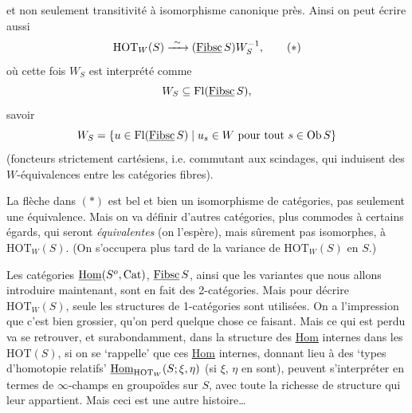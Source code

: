 et non seulement transitivité à isomorphisme canonique près. Ainsi on peut écrire aussi
\[
\mathrm{HOT}_W(S) \xrightarrow{\ \sim\ } (\underline{\mathrm{Fibsc}}\,S)W_S^{-1}, \tag*{$(*)$}
\]
où cette fois $W_S$ est interprété comme
\[
W_S \subseteq \mathrm{Fl}(\underline{\mathrm{Fibsc}}\,S),
\]
savoir
\[
W_S = \{u \in \mathrm{Fl}(\underline{\mathrm{Fibsc}}\,S) \mid u_s \in W \text{ pour tout } s \in \mathrm{Ob}\,S\}
\]
(foncteurs strictement cartésiens, i.e. commutant aux scindages, qui induisent des $W$-équivalences entre les catégories fibres).

La flèche dans $(*)$ est bel et bien un isomorphisme de catégories, pas seulement une équivalence. Mais on va définir d'autres catégories, plus commodes à certains égards, qui seront \textit{équivalentes} (on l'espère), mais sûrement pas isomorphes, à $\mathrm{HOT}_W(S)$. (On s'occupera plus tard de la variance de $\mathrm{HOT}_W(S)$ en $S$.)

Les catégories $\underline{\mathrm{Hom}}(S^o,\mathrm{Cat})$, $\underline{\mathrm{Fibsc}}\,S$, ainsi que les variantes que nous allons introduire maintenant, sont en fait des 2-catégories. Mais pour décrire $\mathrm{HOT}_W(S)$, seule les structures de 1-catégories sont utilisées. On a l'impression que c'est bien %
grossier, qu'on perd quelque chose ce faisant. Mais ce qui est perdu va se retrouver, et surabondamment, dans la structure des \underline{Hom} internes dans les $\mathrm{HOT}(S)$, si on se `rappelle' que ces \underline{Hom} internes, donnant lieu à des `types d'homotopie relatifs' $\underline{\mathrm{Hom}}_{\mathrm{HOT}_W}(S;\xi,\eta)$ (si $\xi$, $\eta$ en sont), peuvent s'interpréter en termes de $\infty$-champs en groupoïdes sur $S$, avec toute la richesse de structure qui leur appartient. Mais ceci est une autre histoire\dots

